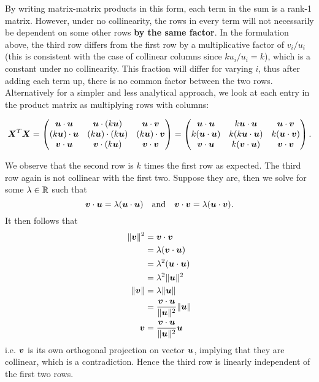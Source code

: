 \documentclass[12pt]{article}
\begin{document}
	By writing matrix-matrix products in this form, each term in the sum is a rank-1 matrix. However, under no collinearity, the rows in every term will not necessarily be dependent on some other rows \textbf{by the same factor}. In the formulation above, the third row differs from the first row by a multiplicative factor of $v_i/u_i$ (this is consistent with the case of collinear columns since $ku_i/u_i=k$), which is a constant under no collinearity. This fraction will differ for varying $i$, thus after adding each term up, there is no common factor between the two rows.\\
	
	Alternatively for a simpler and less analytical approach, we look at each entry in the product matrix as multiplying rows with columns:
	
	$$\boldsymbol{X}^T\boldsymbol{X}=\begin{pmatrix}
		\boldsymbol{u}\cdot\boldsymbol{u} & \boldsymbol{u}\cdot(k\boldsymbol{u}) & \boldsymbol{u}\cdot\boldsymbol{v}\\
		(k\boldsymbol{u})\cdot\boldsymbol{u} & (k\boldsymbol{u})\cdot(k\boldsymbol{u}) & (k\boldsymbol{u})\cdot\boldsymbol{v} \\
		\boldsymbol{v}\cdot\boldsymbol{u} & \boldsymbol{v}\cdot(k\boldsymbol{u}) & \boldsymbol{v}\cdot\boldsymbol{v}
	\end{pmatrix}=\begin{pmatrix}
		\boldsymbol{u}\cdot\boldsymbol{u} & k\boldsymbol{u}\cdot\boldsymbol{u} & \boldsymbol{u}\cdot\boldsymbol{v}\\
		k(\boldsymbol{u}\cdot\boldsymbol{u}) & k(k\boldsymbol{u}\cdot\boldsymbol{u}) & k(\boldsymbol{u}\cdot\boldsymbol{v}) \\
		\boldsymbol{v}\cdot\boldsymbol{u} & k(\boldsymbol{v}\cdot\boldsymbol{u}) & \boldsymbol{v}\cdot\boldsymbol{v}
	\end{pmatrix}.$$
	
	We observe that the second row is $k$ times the first row as expected. The third row again is not collinear with the first two. Suppose they are, then we solve for some $\lm\in\RR$ such that
	$$\boldsymbol{v}\cdot\boldsymbol{u}=\lambda(\boldsymbol{u}\cdot\boldsymbol{u}) \quad \text{and}\quad \boldsymbol{v}\cdot\boldsymbol{v}=\lambda(\boldsymbol{u}\cdot\boldsymbol{v}).$$
	It then follows that
	\begin{align*}
		\|\boldsymbol{v}\|^2&=\boldsymbol{v}\cdot\boldsymbol{v}\\
		&=\lambda(\boldsymbol{v}\cdot\boldsymbol{u})\\
		&=\lambda^2(\boldsymbol{u}\cdot\boldsymbol{u})\\
		&=\lambda^2\|\boldsymbol{u}\|^2\\ 
		\|\boldsymbol{v}\|&=\lambda\|\boldsymbol{u}\|\\
		&=\dfrac{\boldsymbol{v}\cdot\boldsymbol{u}}{\|\boldsymbol{u}\|^2}\|\boldsymbol{u}\|\\
		\boldsymbol{v}&=\dfrac{\boldsymbol{v}\cdot\boldsymbol{u}}{\|\boldsymbol{u}\|^2}\boldsymbol{u}
	\end{align*}
	$$$$
	i.e. $\boldsymbol{v}$ is its own orthogonal projection on vector $\boldsymbol{u}$, implying that they are collinear, which is a contradiction. Hence the third row is linearly independent of the first two rows. \\
	
\end{document}
